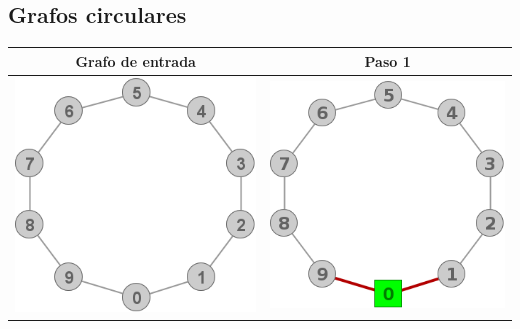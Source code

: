 \subsection{Grafos circulares}
	\begin{center}
		\begin{tabular}{ |c||c| }
			\hline
			Grafo de entrada & Paso 1 \\
			\hline\hline
			\includegraphics[scale = 0.4]{img/ej3/constructiva_golosa/Circle_st0.png} &
			\includegraphics[scale = 0.4]{img/ej3/constructiva_golosa/Circle_st1.png} \\
			\hline
		\end{tabular}
	\end{center}

